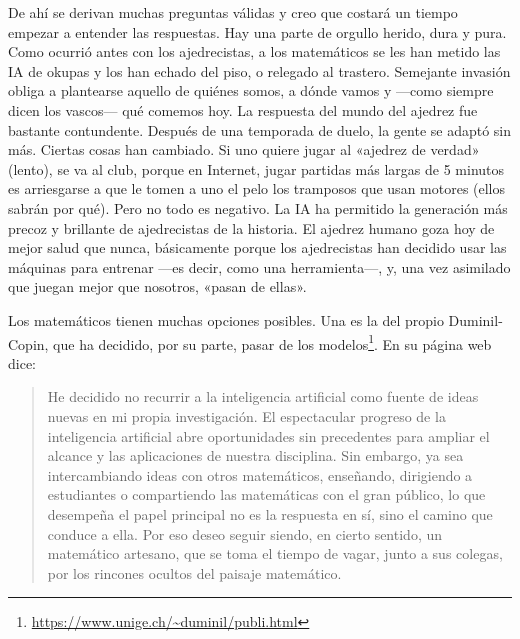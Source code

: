 \documentclass[11pt,a4paper]{article}
\begin{document}
De ahí se derivan muchas preguntas válidas y creo que costará un tiempo empezar a entender las respuestas. Hay una parte de orgullo herido, dura y pura. Como ocurrió antes con los ajedrecistas, a los matemáticos se les han metido las IA de okupas y los han echado del piso, o relegado al trastero. Semejante invasión obliga a plantearse aquello de quiénes somos, a dónde vamos y ---como siempre dicen los vascos--- qué comemos hoy. La respuesta del mundo del ajedrez fue bastante contundente. Después de una temporada de duelo, la gente se adaptó sin más. Ciertas cosas han cambiado. Si uno quiere jugar al «ajedrez de verdad» (lento), se va al club, porque en Internet, jugar partidas más largas de 5 minutos es arriesgarse a que le tomen a uno el pelo los tramposos que usan motores (ellos sabrán por qué). Pero no todo es negativo. La IA ha permitido la generación más precoz y brillante de ajedrecistas de la historia. El ajedrez humano goza hoy de mejor salud que nunca, básicamente porque los ajedrecistas han decidido usar las máquinas para entrenar ---es decir, como una herramienta---, y, una vez asimilado que juegan mejor que nosotros, «pasan de ellas».

Los matemáticos tienen muchas opciones posibles. Una es la del propio Duminil-Copin, que ha decidido, por su parte, pasar de los modelos\footnote{\url{https://www.unige.ch/~duminil/publi.html}}. En su página web dice:

\begin{quotation}
He decidido no recurrir a la inteligencia artificial como fuente de ideas nuevas en mi propia investigación. El espectacular progreso de la inteligencia artificial abre oportunidades sin precedentes para ampliar el alcance y las aplicaciones de nuestra disciplina. Sin embargo, ya sea intercambiando ideas con otros matemáticos, enseñando, dirigiendo a estudiantes o compartiendo las matemáticas con el gran público, lo que desempeña el papel principal no es la respuesta en sí, sino el camino que conduce a ella. Por eso deseo seguir siendo, en cierto sentido, un matemático artesano, que se toma el tiempo de vagar, junto a sus colegas, por los rincones ocultos del paisaje matemático.
\end{quotation}
\end{document}
